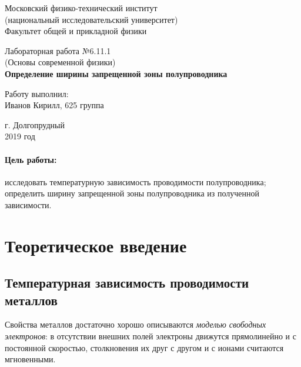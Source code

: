 \documentclass[12pt]{kiarticle} %
\begin{document}
	
	\begin{titlepage}
		\begin{center}
			\large 	Московский физико-технический институт \\
			(национальный исследовательский университет) \\
			Факультет общей и прикладной физики \\
			\vspace{0.2cm}
			
			\vspace{4.5cm}
			Лабораторная работа №6.11.1  \\ \vspace{0.2cm}
			\large (Основы современной физики) \\ \vspace{0.2cm}
			\LARGE \textbf{ Определение ширины запрещенной зоны полупроводника  }
		\end{center}
		\vspace{2.3cm} \large
		
		\begin{center}
			Работу выполнил: \\
			Иванов Кирилл,
			625 группа
			\vspace{10mm}		
			
		\end{center}
		
		\begin{center} \vspace{60mm}
			г. Долгопрудный \\
			2019 год
		\end{center}
	\end{titlepage}


	\paragraph*{Цель работы:} исследовать температурную зависимость проводимости полупроводника; определить ширину запрещенной зоны полупроводника из полученной зависимости.
	
	\section{Теоретическое введение }
	\subsection{Температурная зависимость проводимости металлов}
	
	Свойства металлов достаточно хорошо описываются \textit{моделью свободных электронов}: в отсутствии внешних полей электроны движутся прямолинейно и с постоянной скоростью, столкновения их друг с другом и с ионами считаются мгновенными. 
	
\end{document}

